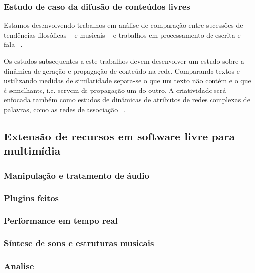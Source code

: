 \subsubsection{Estudo de caso da difusão de conteúdos livres}
\label{sec:dif_sl}

Estamos desenvolvendo trabalhos em análise de comparação
entre sucessões de tendências filosóficas ~\cite{philome} e
musicais ~\cite{musime} e trabalhos em processamento de escrita
e fala ~\cite{rede-associacoes, complenet, enfmc, ifsc}.

Os estudos subsequentes a este trabalhos devem desenvolver
um estudo sobre a dinâmica de geração e propagação de conteúdo na rede.
Comparando textos e ustilizando medidas de similaridade separa-se
o que um texto não contém e o que é semelhante, i.e. servem de propagação
um do outro. A criatividade será enfocada também como estudos de dinâmicas
de atributos de redes complexas de palavras, como as redes de associação ~\cite{rede-associacoes}.


\subsection{Extensão de recursos em software livre para multimídia}
\label{sec:extensao}

\subsubsection{Manipulação e tratamento de áudio}
\label{sec:manip-audio}


\subsubsection{Plugins feitos}
\label{sec:tutoriais}

\subsubsection{Performance em tempo real}
\label{sec:perf}
  
\subsubsection{Síntese de sons e estruturas musicais}
\label{sec:sintese}

\subsubsection{Analise}
\label{sec:analise}